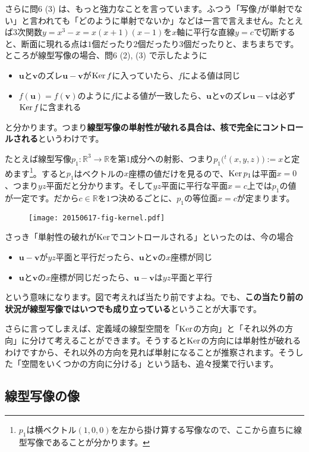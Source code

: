 さらに問6 (3) は、もっと強力なことを言っています。ふつう「写像$f$が単射でない」と言われても「どのように単射でないか」などは一言で言えません。たとえば$3$次関数$y = x^3 - x = x(x+1)(x-1)$を$x$軸に平行な直線$y = c$で切断すると、断面に現れる点は$1$個だったり$2$個だったり$3$個だったりと、まちまちです。ところが線型写像の場合、問6 (2), (3) で示したように
\begin{itemize}
\item $\bm{u}$と$\bm{v}$のズレ$\bm{u} - \bm{v}$が$\operatorname{Ker} f$に入っていたら、$f$による値は同じ
\item $f(\bm{u}) = f(\bm{v})$のように$f$による値が一致したら、$\bm{u}$と$\bm{v}$のズレ$\bm{u} - \bm{v}$は必ず$\operatorname{Ker} f$に含まれる
\end{itemize}
と分かります。つまり\textbf{線型写像の単射性が破れる具合は、核で完全にコントロールされる}というわけです。

たとえば線型写像$p_1\colon \mathbb{R}^3 \rightarrow \mathbb{R}$を第$1$成分への射影、つまり$p_1\bigl({}^t(x, y, z)\bigr) := x$と定めます\footnote{$p_1$は横ベクトル$(1, 0, 0)$を左から掛け算する写像なので、ここから直ちに線型写像であることが分かります。}。すると$p_1$はベクトルの$x$座標の値だけを見るので、$\operatorname{Ker} p_1$は平面$x = 0$、つまり$yz$平面だと分かります。そして$yz$平面に平行な平面$x = c$上では$p_1$の値が一定です。だから$c \in \mathbb{R}$を$1$つ決めるごとに、$p_1$の等位面$x = c$が定まります。
\begin{figure}[h!tbp] %
\centering
\texttt{[image: 20150617-fig-kernel.pdf]}
\end{figure}

さっき「単射性の破れが$\operatorname{Ker}$でコントロールされる」といったのは、今の場合
\begin{itemize}
\item $\bm{u} - \bm{v}$が$yz$平面と平行だったら、$\bm{u}$と$\bm{v}$の$x$座標が同じ
\item $\bm{u}$と$\bm{v}$の$x$座標が同じだったら、$\bm{u} - \bm{v}$は$yz$平面と平行
\end{itemize}
という意味になります。図で考えれば当たり前ですよね。でも、\textbf{この当たり前の状況が線型写像ではいつでも成り立っている}ということが大事です。

さらに言ってしまえば、定義域の線型空間を「$\operatorname{Ker}$の方向」と「それ以外の方向」に分けて考えることができます。そうすると$\operatorname{Ker}$の方向には単射性が破れるわけですから、それ以外の方向を見れば単射になることが推察されます。そうした「空間をいくつかの方向に分ける」という話も、追々授業で行います。

\subsection{線型写像の像}

